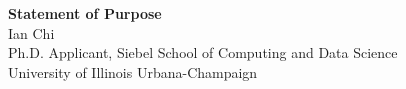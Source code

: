 \documentclass[11pt]{article}
\begin{document}
\begin{center}
    {\Large \textbf{Statement of Purpose}}\\[4pt]
    {\large Ian Chi}\\[2pt]
    Ph.D. Applicant, Siebel School of Computing and Data Science\\
    University of Illinois Urbana-Champaign
\end{center}

\vspace{1em}

\end{document}
